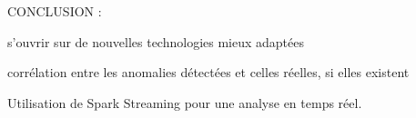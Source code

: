 CONCLUSION : 

s'ouvrir sur de nouvelles technologies mieux adaptées

corrélation entre les anomalies détectées et celles réelles, si elles existent

Utilisation de Spark Streaming pour une analyse en temps réel.